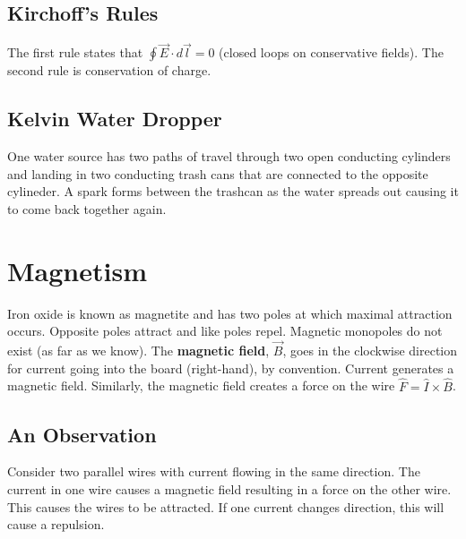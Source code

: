 \documentclass{article}
\begin{document}
\subsection{Kirchoff's Rules}
The first rule states that $\oint \vec{E}\cdot d\vec{l}=0$ (closed loops on conservative fields).
The second rule is conservation of charge.

\subsection{Kelvin Water Dropper}
One water source has two paths of travel through two open conducting cylinders and landing in two conducting trash cans 
that are connected to the opposite cylineder. A spark forms between the trashcan as the water spreads out causing it to come back together again.

\section{Magnetism}
Iron oxide is known as magnetite and has two poles at which maximal attraction occurs. 
Opposite poles attract and like poles repel. Magnetic monopoles do not exist (as far as we know).
The \textbf{magnetic field}, $\vec{B}$, goes in the clockwise direction for current going into the board (right-hand), by convention.
Current generates a magnetic field. Similarly, the magnetic field creates a force on the wire $\hat{F}=\hat{I}\times\hat{B}$.

\subsection{An Observation}
Consider two parallel wires with current flowing in the same direction. The current in one wire causes a magnetic field 
resulting in a force on the other wire. This causes the wires to be attracted. If one current changes direction,
this will cause a repulsion.
\end{document}
